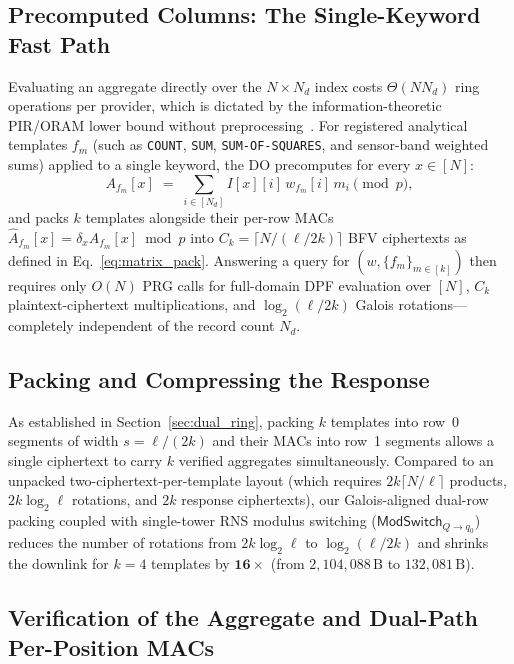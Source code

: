 \documentclass[11pt,a4paper]{article}
\begin{document}
\subsection{Precomputed Columns: The Single-Keyword Fast Path}\label{sec:fast_path}

Evaluating an aggregate directly over the $N \times N_d$ index costs $\Theta(N N_d)$ ring operations per provider, which is dictated by the information-theoretic PIR/ORAM lower bound without preprocessing~\cite{beimel2000,goldreich1996}. For registered analytical templates $f_m$ (such as \texttt{COUNT}, \texttt{SUM}, \texttt{SUM-OF-SQUARES}, and sensor-band weighted sums) applied to a single keyword, the DO precomputes for every $x \in [N]$:
\begin{equation}
    A_{f_m}[x] \;=\; \sum_{i \in [N_d]} I[x][i]\, w_{f_m}[i]\, m_i \pmod p,
\end{equation}
and packs $k$ templates alongside their per-row MACs $\widehat{A}_{f_m}[x] = \delta_x A_{f_m}[x] \bmod p$ into $C_k = \lceil N / (\ell/2k) \rceil$ BFV ciphertexts as defined in Eq.~\eqref{eq:matrix_pack}. Answering a query for $(w, \{f_m\}_{m \in [k]})$ then requires only $O(N)$ PRG calls for full-domain DPF evaluation over $[N]$, $C_k$ plaintext-ciphertext multiplications, and $\log_2(\ell/2k)$ Galois rotations---completely independent of the record count $N_d$.

\subsection{Packing and Compressing the Response}\label{sec:packing}

As established in Section~\ref{sec:dual_ring}, packing $k$ templates into row~0 segments of width $s = \ell/(2k)$ and their MACs into row~1 segments allows a single ciphertext to carry $k$ verified aggregates simultaneously. Compared to an unpacked two-ciphertext-per-template layout (which requires $2k\lceil N/\ell\rceil$ products, $2k\log_2 \ell$ rotations, and $2k$ response ciphertexts), our Galois-aligned dual-row packing coupled with single-tower RNS modulus switching ($\mathsf{ModSwitch}_{Q \to q_0}$) reduces the number of rotations from $2k\log_2 \ell$ to $\log_2(\ell/2k)$ and shrinks the downlink for $k=4$ templates by $\mathbf{16\times}$ (from $2{,}104{,}088\,\text{B}$ to $132{,}081\,\text{B}$).

\subsection{Verification of the Aggregate and Dual-Path Per-Position MACs}\label{sec:verification}
\end{document}
